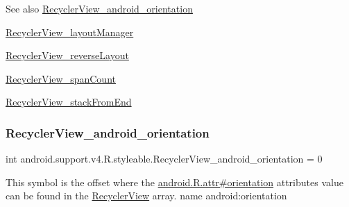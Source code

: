\begin{DoxySeeAlso}{See also}
\hyperlink{classandroid_1_1support_1_1v4_1_1R_1_1styleable_a45d2052c430de024aae5de8cf614d894}{Recycler\+View\+\_\+android\+\_\+orientation} 

\hyperlink{classandroid_1_1support_1_1v4_1_1R_1_1styleable_ab6b6c3ab74ca094457a85f1e6996a730}{Recycler\+View\+\_\+layout\+Manager} 

\hyperlink{classandroid_1_1support_1_1v4_1_1R_1_1styleable_a0af7d1bacde2568fa5bbd69fe6f3261e}{Recycler\+View\+\_\+reverse\+Layout} 

\hyperlink{classandroid_1_1support_1_1v4_1_1R_1_1styleable_a2fc5b4b990851afc287e7ab8f60f18f8}{Recycler\+View\+\_\+span\+Count} 

\hyperlink{classandroid_1_1support_1_1v4_1_1R_1_1styleable_ab104a582751ed1c1f7370efc87b2d64b}{Recycler\+View\+\_\+stack\+From\+End} 
\end{DoxySeeAlso}
\mbox{\label{classandroid_1_1support_1_1v4_1_1R_1_1styleable_a45d2052c430de024aae5de8cf614d894}} 
\subsubsection{\texorpdfstring{Recycler\+View\+\_\+android\+\_\+orientation}{RecyclerView\_android\_orientation}}
{\footnotesize\ttfamily int android.\+support.\+v4.\+R.\+styleable.\+Recycler\+View\+\_\+android\+\_\+orientation = 0\hspace{0.3cm}{\ttfamily [static]}}

This symbol is the offset where the \hyperlink{}{android.\+R.\+attr\#orientation} attribute\textquotesingle{}s value can be found in the \hyperlink{classandroid_1_1support_1_1v4_1_1R_1_1styleable_ad60a429c2c839e07a58e4212d7ffeba0}{Recycler\+View} array.  name android\+:orientation \mbox{\label{classandroid_1_1support_1_1v4_1_1R_1_1styleable_ab6b6c3ab74ca094457a85f1e6996a730}} 
